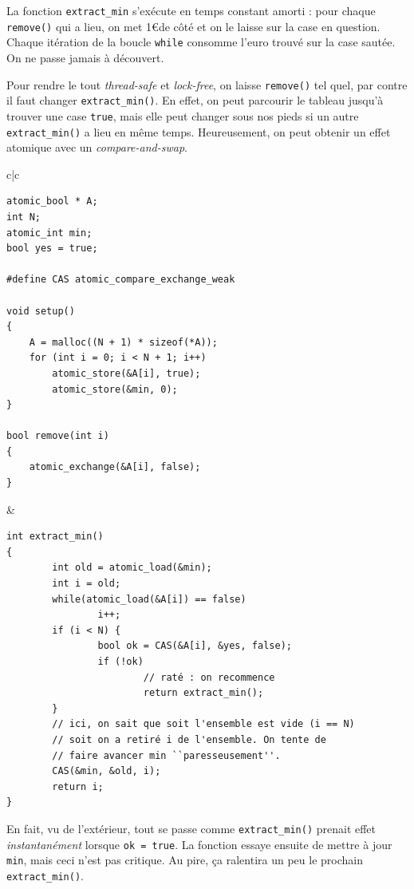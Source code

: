La fonction \texttt{extract\_min} s'exécute en temps constant amorti : pour
chaque \texttt{remove()} qui a lieu, on met 1\euro de côté et on le laisse sur
la case en question. Chaque itération de la boucle \texttt{while} consomme
l'euro trouvé sur la case sautée. On ne passe jamais à découvert.

Pour rendre le tout \emph{thread-safe} et \emph{lock-free}, on laisse
\texttt{remove()} tel quel, par contre il faut changer
\texttt{extract\_min()}. En effet, on peut parcourir le tableau jusqu'à trouver
une case \texttt{true}, mais elle peut changer \og sous nos pieds\fg{} si un
autre \texttt{extract\_min()} a lieu en même temps. Heureusement, on peut
obtenir un effet atomique avec un \emph{compare-and-swap}.

\begin{tabular}{c|c}
\begin{minipage}[t]{0.42\textwidth}
\begin{verbatim}
atomic_bool * A;
int N;
atomic_int min;
bool yes = true;

#define CAS atomic_compare_exchange_weak

void setup()
{
	A = malloc((N + 1) * sizeof(*A));
	for (int i = 0; i < N + 1; i++)
		atomic_store(&A[i], true);
        atomic_store(&min, 0);
}

bool remove(int i)
{
	atomic_exchange(&A[i], false);
}
\end{verbatim}
\end{minipage}
  &
\begin{minipage}[t]{0.58\textwidth}
\begin{verbatim}
int extract_min()
{
        int old = atomic_load(&min);
        int i = old;
        while(atomic_load(&A[i]) == false)
                i++;
        if (i < N) {
                bool ok = CAS(&A[i], &yes, false);
                if (!ok)
                        // raté : on recommence
                        return extract_min();
        }
        // ici, on sait que soit l'ensemble est vide (i == N)
        // soit on a retiré i de l'ensemble. On tente de
        // faire avancer min ``paresseusement''.
        CAS(&min, &old, i);
        return i;
}
\end{verbatim}
\end{minipage}
\end{tabular}

En fait, vu de l'extérieur, tout se passe comme \texttt{extract\_min()} \og
prenait effet \fg{} \emph{instantanément} lorsque \texttt{ok = true}. La
fonction essaye ensuite de mettre à jour \texttt{min}, mais ceci n'est pas
critique. Au pire, ça ralentira un peu le prochain \texttt{extract\_min()}.

